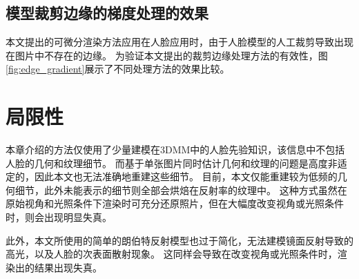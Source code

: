 \subsection{模型裁剪边缘的梯度处理的效果}

本文提出的可微分渲染方法应用在人脸应用时，由于人脸模型的人工裁剪导致出现在图片中不存在的边缘。
为验证本文提出的裁剪边缘处理方法的有效性，图\ref{fig:edge_gradient}展示了不同处理方法的效果比较。

\section{局限性}

本章介绍的方法仅使用了少量建模在3DMM中的人脸先验知识，该信息中不包括人脸的几何和纹理细节。
而基于单张图片同时估计几何和纹理的问题是高度非适定的，因此本文也无法准确地重建这些细节。
目前，本文仅能重建较为低频的几何细节，此外未能表示的细节则全部会烘焙在反射率的纹理中。
这种方式虽然在原始视角和光照条件下渲染时可充分还原照片，但在大幅度改变视角或光照条件时，则会出现明显失真。

此外，本文所使用的简单的朗伯特反射模型也过于简化，无法建模镜面反射导致的高光，以及人脸的次表面散射现象。
这同样会导致在改变视角或光照条件时，渲染出的结果出现失真。
